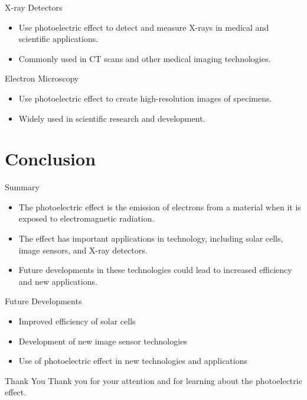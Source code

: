\documentclass{beamer}
\begin{document}
\begin{frame}{X-ray Detectors}
    \begin{itemize}
      \item Use photoelectric effect to detect and measure X-rays in medical and scientific applications.
      \item Commonly used in CT scans and other medical imaging technologies.
      \end{itemize}
      \end{frame}
      
      \begin{frame}{Electron Microscopy}
      \begin{itemize}
      \item Use photoelectric effect to create high-resolution images of specimens.
      \item Widely used in scientific research and development.
      \end{itemize}
      \end{frame}
      
      \section{Conclusion}
      \begin{frame}{Summary}
      \begin{itemize}
      \item The photoelectric effect is the emission of electrons from a material when it is exposed to electromagnetic radiation.
      \item The effect has important applications in technology, including solar cells, image sensors, and X-ray detectors.
      \item Future developments in these technologies could lead to increased efficiency and new applications.
      \end{itemize}
      \end{frame}
      
      \begin{frame}{Future Developments}
      \begin{itemize}
      \item Improved efficiency of solar cells
      \item Development of new image sensor technologies
      \item Use of photoelectric effect in new technologies and applications
      \end{itemize}
      \end{frame}
      
      \begin{frame}{Thank You}
      Thank you for your attention and for learning about the photoelectric effect.
      \end{frame}
      
      
\end{document}
